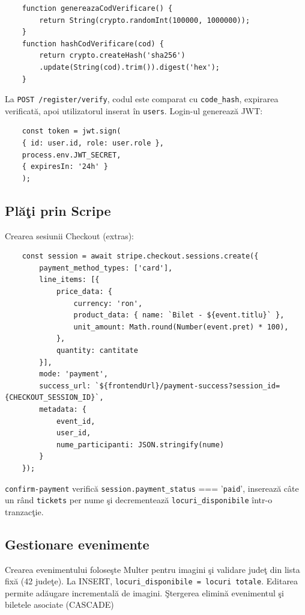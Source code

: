 \begin{lstlisting} 
	function genereazaCodVerificare() {
		return String(crypto.randomInt(100000, 1000000));
	}
	function hashCodVerificare(cod) {
		return crypto.createHash('sha256')
		.update(String(cod).trim()).digest('hex');
	}
\end{lstlisting}

La \texttt{POST /register/verify}, codul este comparat cu \texttt{code\_hash}, expirarea verificat\u a, apoi utilizatorul inserat \^in \texttt{users}. Login-ul genereaz\u a JWT: 

\begin{lstlisting}
	const token = jwt.sign(
	{ id: user.id, role: user.role },
	process.env.JWT_SECRET,
	{ expiresIn: '24h' }
	);
\end{lstlisting}

\subsection{Pl\u a\c ti prin Scripe}

Crearea sesiunii Checkout (extras):

\begin{lstlisting}
	const session = await stripe.checkout.sessions.create({
		payment_method_types: ['card'],
		line_items: [{ 
			price_data: {
				currency: 'ron',
				product_data: { name: `Bilet - ${event.titlu}` },
				unit_amount: Math.round(Number(event.pret) * 100),
			}, 
			quantity: cantitate 
		}],
		mode: 'payment',
		success_url: `${frontendUrl}/payment-success?session_id={CHECKOUT_SESSION_ID}`,
		metadata: { 
			event_id, 
			user_id, 
			nume_participanti: JSON.stringify(nume)
		}
	});
\end{lstlisting}

\texttt{confirm-payment} verific\u a \texttt{session.payment\_status} === '\texttt{paid}', insereaz\u a
c\^ate un r\^and \texttt{tickets} per nume \c si decrementeaz\u a \texttt{locuri\_disponibile} \^intr-o tranzac\c tie.

\subsection{Gestionare evenimente}

Crearea evenimentului folose\c ste Multer pentru imagini \c si validare jude\c t din lista fix\u a (42 jude\c te). La INSERT, \texttt{locuri\_disponibile = locuri totale}. Editarea permite ad\u augare incremental\u a de imagini. \c Stergerea elimin\u a evenimentul \c si biletele asociate (CASCADE)


